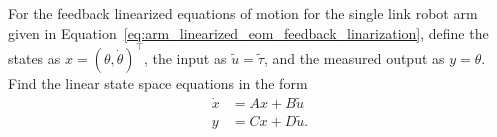 For the feedback linearized equations of motion for the single link robot arm given in Equation~\eqref{eq:arm_linearized_eom_feedback_linarization}, define the states as $x=(\theta,\dot{\theta})^{\top}$, the input as $\tilde{u}=\tilde{\tau}$, and the measured output as $y=\theta$.  Find the linear state space equations in the form
\begin{align*}
	\dot{x} &= Ax + B\tilde{u} \\
	y &= Cx + D\tilde{u}.
\end{align*} 
